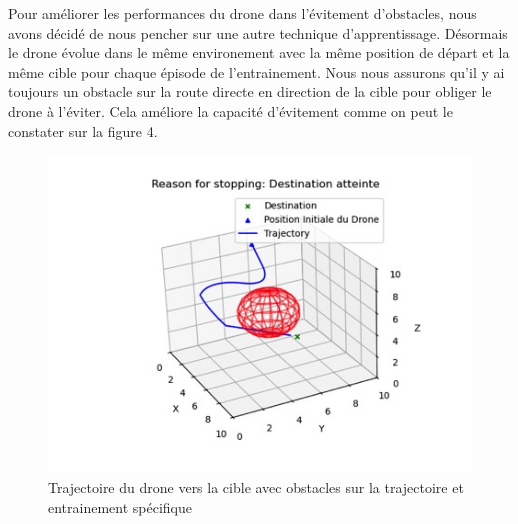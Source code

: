 \documentclass[a4paper, 12pt]{article}
\begin{document}
Pour améliorer les performances du drone dans l'évitement d'obstacles, nous avons décidé de nous pencher sur une autre technique d'apprentissage. Désormais le drone évolue dans le même environement avec la même position de départ et la même cible pour chaque épisode de l'entrainement. Nous nous assurons qu'il y ai toujours un obstacle sur la route directe en direction de la cible pour obliger le drone à l'éviter. Cela améliore la capacité d'évitement comme on peut le constater sur la figure 4.
\begin{figure}[h]
    \centering
    \includegraphics[width=\textwidth]{att.D1KL_7bUX90t0ksXRxzEPxHcgLQs8o7jh7mdn5SYMgo.png}
    \caption{Trajectoire du drone vers la cible avec obstacles sur la trajectoire et entrainement spécifique}
\end{figure}
\end{document}
